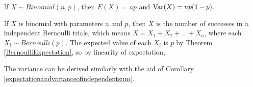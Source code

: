 \begin{thm}If $X \sim Binomial(n,p)$, then $E(X) = np$ and $\operatorname{Var}(X) = np(1-p)$.
\end{thm}
\begin{pf}
If $X$ is binomial with parameters $n$ and $p$, then $X$ is the number of successes in $n$ independent Bernoulli trials, which means $X = X_1 + X_2 + ... + X_n$, where each $X_i \sim Bernoulli(p)$. The expected value of each $X_i$ is $p$ by Theorem \ref{BernoulliExpectation}, so by linearity of expectation,
\par
\noindent The variance can be derived similarly with the aid of Corollary \ref{expectationandvarianceofindependentsum}.
\end{pf}
\par

